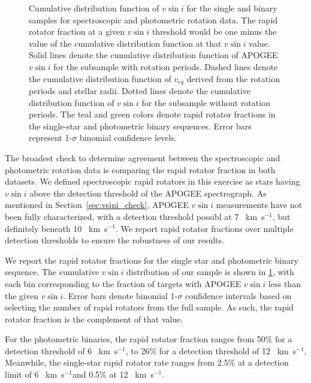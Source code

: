 \documentclass[manuscript]{aastex6}
\newcommand{\vsini}{\ensuremath{v \sin i}}
\newcommand{\kms}{\textrm{~km~s}\ensuremath{^{-1}}}
\begin{document}
\begin{figure}[htb]
    \caption{Cumulative distribution function of \vsini{} for the single and
        binary samples for spectroscopic and photometric rotation data. The 
        rapid rotator fraction at a given \vsini{} threshold
    would be one minus the value of the cumulative distribution function
    at that \vsini{} value. Solid lines denote the cumulative
    distribution function of APOGEE \vsini{} for the subsample with rotation
    periods. Dashed lines denote  
    the cumulative distribution function of \(v_{eq}\) derived from the
    rotation periods and stellar radii. Dotted lines denote the
    cumulative distribution function of \vsini{} for the subsample without
    rotation periods. The teal and green colors denote rapid rotator fractions
in the single-star and photometric binary sequences. Error bars represent 
    1-\(\sigma\) binomial confidence levels.\label{fig:detection_fraction}}
\end{figure}

The broadest check to determine agreement between the spectroscopic
and photometric rotation data is comparing the rapid rotator fraction
in both datasets. We defined spectroscopic rapid rotators in this exercise as 
stars having \vsini{} above the detection threshold of the APOGEE 
spectrograph. As mentioned in 
Section~\ref{sec:vsini_check}, APOGEE \vsini{} measurements have not been fully
characterized, with a detection threshold possibl at 7 \kms{}, but definitely
beneath 10 \kms{}. We report rapid rotator fractions over multiple detection 
thresholds to ensure the robustness of our results.

We report the rapid rotator fractions for the single star and photometric
binary sequence. The cumulative \vsini{} distribution of our sample is shown 
in \cref{fig:detection_fraction}, with each bin corresponding to the
fraction of targets with APOGEE \vsini{} less than the given
\vsini{}. Error bars denote  binomial 1-\(\sigma\) confidence 
intervals based on selecting the number of rapid rotators from the full 
sample.  As such, the rapid rotator fraction is the complement of that
value. 

For the photometric binaries, the rapid rotator fraction ranges from 50\% for a
detection threshold of 6 \kms, to 26\% for a detection threshold of 12 \kms.
Meanwhile, the single-star rapid rotator rate ranges from 2.5\% at a detection
limit of 6 \kms and 0.5\% at 12 \kms.
\end{document}
